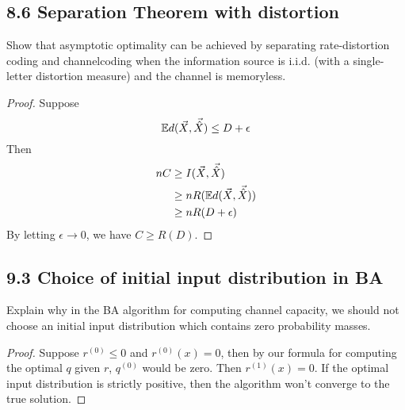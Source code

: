 \documentclass[../main.tex]{subfiles}
\begin{document}
\subsection*{8.6 Separation Theorem with distortion}
Show that asymptotic optimality can be achieved by separating rate-distortion coding and channelcoding when the information source is i.i.d. (with a single-letter distortion measure) and the channel is memoryless.
\begin{proof}
    Suppose \[
    \mathbb{E} d(\vec X, \vec{\hat X})\leq D+\epsilon
    \]
    Then \begin{align*}
        nC&\geq I(\vec X,\vec{\hat X}) \\
        &\geq nR(\mathbb{E} d(\vec X,\vec{\hat X}))\\
        &\geq nR(D+\epsilon)
    \end{align*}
    By letting $\epsilon\to 0$, we have $C\geq R(D)$.
\end{proof}

\subsection*{9.3 Choice of initial input distribution in BA}
Explain why in the BA algorithm for computing channel capacity, we should not choose an initial input distribution which contains zero probability masses.
\begin{proof}
    Suppose $r^{(0)}\leq 0$ and $r^{(0)}(x)=0$, then by our formula for computing the optimal $q$ given $r$, $q^{(0)}$ would be zero. Then $r^{(1)}(x)=0$. If the optimal input distribution is strictly positive, then the algorithm won't converge to the true solution.
\end{proof}
\end{document}
